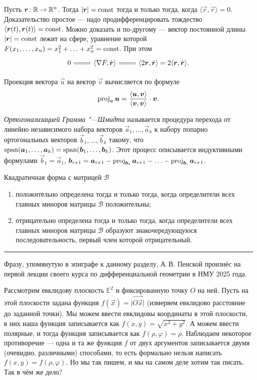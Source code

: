 Пусть $\boldsymbol{r}\colon \mathbb{R} \to \mathbb{R}^n$. Тогда $\left\lvert\boldsymbol{r}\right\rvert = \mathrm{const}$ тогда и только тогда, когда $\langle \vec{r}, \dot{\vec{r}} \rangle = 0$. Доказательство простое --- надо продифференцировать тождество $\langle \boldsymbol{r}(t), \boldsymbol{r}(t) \rangle = \mathrm{const}$. Можно доказать и по-другому --- вектор постоянной длины $\left\lvert\boldsymbol{r}\right\rvert = \mathrm{const}$ лежит на сфере, уравнение которой $F(x_1, \ldots, x_n) = x_1^2 + \ldots + x_n^2 = \mathrm{const}$. При этом
\[\begin{tikzcd}
	{0} & {\langle\nabla{F}, \dot{\vec{r}}\rangle} & {\langle 2\vec{r}, \dot{\vec{r}}\rangle = 2\langle\vec{r}, \dot{\vec{r}}\rangle}.
	\arrow[equals, from=1-2, to=1-1]
	\arrow[equals, from=1-2, to=1-3]
\end{tikzcd}\]

Проекция вектора $\vec{u}$ на вектор $\vec{v}$ вычисляется по формуле
\[
	\operatorname{proj}_{\boldsymbol{v}}\boldsymbol{u} = \frac{\langle\boldsymbol{u}, \boldsymbol{v}\rangle}{\langle\boldsymbol{v}, \boldsymbol{v}\rangle} \cdot \boldsymbol{v}.
\]

\textit{Ортогонализацией Грамма "---Шмидта} называется процедура перехода от линейно независимого набора векторов $\vec{a}_1, \ldots, \vec{a}_k$ к набору попарно ортогональных векторов $\vec{b}_1, \ldots, \vec{b}_k$ такому, что $\operatorname{span}(\boldsymbol{a}_1, \ldots, \boldsymbol{a}_k) = \operatorname{span}(\boldsymbol{b}_1, \ldots, \boldsymbol{b}_k)$. Этот процесс описывается индуктивными формулами $\vec{b}_1 = \vec{a}_1$, $\boldsymbol{b}_{i + 1} = \boldsymbol{a}_{i + 1} - \operatorname{proj}_{\boldsymbol{b}_1}\boldsymbol{a}_{i + 1} - \ldots - \operatorname{proj}_{\boldsymbol{b}_i}\boldsymbol{a}_{i + 1}$.

\begin{theorem}
	Квадратичная форма с матрицей $\mathcal{B}$
	\begin{enumerate}[nolistsep, label=(\arabic*)]
		\item положительно определена тогда и только тогда, когда определители всех главных миноров матрицы $\mathcal{B}$ положительны;
		\item отрицательно определена тогда и только тогда, когда определители всех главных миноров матрицы $\mathcal{B}$ образуют знакочередующуюся последовательность, первый член которой отрицательный.
	\end{enumerate}
\end{theorem}

\medskip
\hrule
\medskip

Фразу, упомянутую в эпиграфе к данному разделу, А.\,В. Пенской произнёс на первой лекции своего курса по дифференциальной геометрии в НМУ 2025 года.

Рассмотрим евклидову плоскость\footnotemark{} $\mathbb{E}^2$ и фиксированную точку $O$ на ней. Пусть на этой плоскости задана функция $f(\vec{x}) = \big|\overrightarrow{O\vec{x}}\big|$ (измеряем евклидово расстояние до заданной точки). Мы можем ввести евклидовы координаты в этой плоскости, в них наша функция записывается как $f(x, y) = \sqrt{x^2 + y^2}$. А можем ввести полярные, и тогда функция записывается как $f(\rho, \varphi) = \rho$. Наблюдаем некоторое противоречие --- одна и та же функция $f$ от двух аргументов записывается двумя (очевидно, различными) способами, то есть формально нельзя написать $f(x, y) = f(\rho, \varphi)$. Но мы так пишем, и мы на самом деле хотим так писать. Так в чём же дело?

